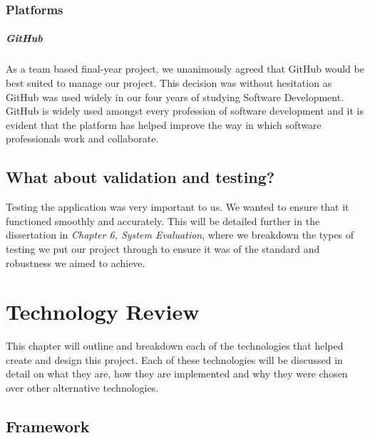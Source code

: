 \subsection{Platforms}
\paragraph{GitHub}
As a team based final-year project, we unanimously agreed that GitHub\cite{github} would be best suited to manage our project. This decision was without hesitation as GitHub was used widely in our four years of studying Software Development. GitHub is widely used amongst every profession of software development and it is evident that the platform has helped improve the way in which software professionals work and collaborate\cite{zagalsky2015emergence}.

\section{What about validation and testing?}
Testing the application was very important to us. We wanted to ensure that it functioned smoothly and accurately. This will be detailed further in the dissertation in \textit{Chapter 6, System Evaluation}, where we breakdown the types of testing we put our project through to ensure it was of the standard and robustness we aimed to achieve.


\chapter{Technology Review}
This chapter will outline and breakdown each of the technologies that helped create and design this project. Each of these technologies will be discussed in detail on what they are, how they are implemented and why they were chosen over other alternative technologies.

\section{Framework}
